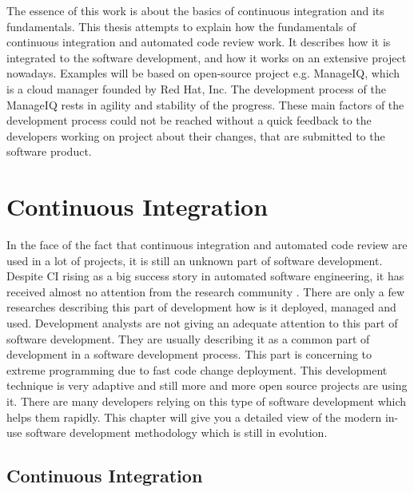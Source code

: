 The essence of this work is about the basics of continuous integration and its fundamentals. This thesis attempts to explain how the fundamentals of continuous integration and automated code review work. It describes how it is integrated to the software development, and how it works on an extensive project nowadays. Examples will be based on open-source project e.g. ManageIQ, which is a cloud manager founded by Red Hat, Inc. The development process of the ManageIQ rests in agility and stability of the progress. These main factors of the development process could not be reached without a quick feedback to the developers working on project about their changes, that are submitted to the software product.

\chapter{Continuous Integration}

In the face of the fact that continuous integration and automated code review are used in a lot of projects, it is still an unknown part of software development. Despite CI rising as a big success story in automated software engineering, it has received almost no attention from the research community \cite{COPE}. There are only a few researches describing this part of development how is it deployed, managed and used. Development analysts are not giving an adequate attention to this part of software development. They are usually describing it as a common part of development in a software development process. This part is concerning to extreme programming due to fast code change deployment. This development technique is very adaptive and still more and more open source projects are using it. There are many developers relying on this type of software development which helps them rapidly. This chapter will give you a detailed view of the modern in-use software development methodology which is still in evolution.

\section{Continuous Integration}


